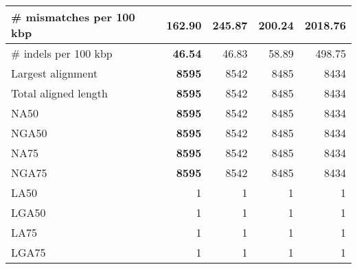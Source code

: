 \documentclass[12pt,a4paper]{article}
\begin{document}
\begin{table}[ht]
\begin{center}
\begin{tabular}{|l*{4}{|r}|}
\# mismatches per 100 kbp & {\bf 162.90} & 245.87 & 200.24 & 2018.76 \\ \hline
\# indels per 100 kbp & {\bf 46.54} & 46.83 & 58.89 & 498.75 \\ \hline
Largest alignment & {\bf 8595} & 8542 & 8485 & 8434 \\ \hline
Total aligned length & {\bf 8595} & 8542 & 8485 & 8434 \\ \hline
NA50 & {\bf 8595} & 8542 & 8485 & 8434 \\ \hline
NGA50 & {\bf 8595} & 8542 & 8485 & 8434 \\ \hline
NA75 & {\bf 8595} & 8542 & 8485 & 8434 \\ \hline
NGA75 & {\bf 8595} & 8542 & 8485 & 8434 \\ \hline
LA50 & 1 & 1 & 1 & 1 \\ \hline
LGA50 & 1 & 1 & 1 & 1 \\ \hline
LA75 & 1 & 1 & 1 & 1 \\ \hline
LGA75 & 1 & 1 & 1 & 1 \\ \hline
\end{tabular}
\end{center}
\end{table}
\end{document}
